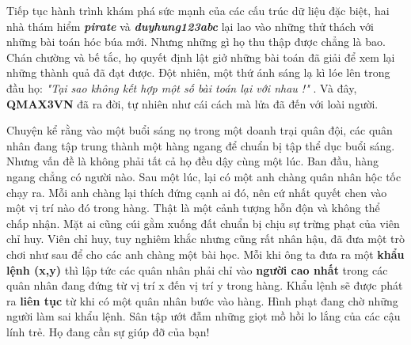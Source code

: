 Tiếp tục hành trình khám phá sức mạnh của các cấu trúc dữ liệu đặc biệt, hai nhà thám hiểm   \textbf{\emph{     pirate    }}   và   \textbf{\emph{     duyhung123abc    }}   lại lao vào những thử thách với những bài toán hóc búa mới. Nhưng những gì họ thu thập được chẳng là bao. Chán chường và bế tắc, họ quyết định lật giở những bài toán đã giải để xem lại những thành quả đã đạt được. Đột nhiên, một thứ ánh sáng lạ kì lóe lên trong đầu họ:   \emph{    "Tại sao không kết hợp một số bài toán lại với nhau !"   }   . Và đây,   \textbf{    QMAX3VN   }   đã ra đời, tự nhiên như cái cách mà lửa đã đến với loài người.  

   Chuyện kể rằng vào một buổi sáng nọ trong một doanh trại quân đội, các quân nhân đang tập trung thành một hàng ngang để chuẩn bị tập thể dục buổi sáng. Nhưng vấn đề là không phải tất cả họ đều dậy cùng một lúc. Ban đầu, hàng ngang chẳng có người nào. Sau một lúc, lại có một anh chàng quân nhân hộc tốc chạy ra. Mỗi anh chàng lại thích đứng cạnh ai đó, nên cứ nhất quyết chen vào một vị trí nào đó trong hàng. Thật là một cảnh tượng hỗn độn và không thể chấp nhận. Mặt ai cũng cúi gằm xuống đất chuẩn bị chịu sự trừng phạt của viên chỉ huy. Viên chỉ huy, tuy nghiêm khắc nhưng cũng rất nhân hậu, đã đưa một trò chơi như sau để cho các anh chàng một bài học. Mỗi khi ông ta đưa ra một   \textbf{    khẩu lệnh (x,y)   }   thì lập tức các quân nhân phải chỉ vào   \textbf{    người cao nhất   }   trong các quân nhân đang đứng từ vị trí x đến vị trí y trong hàng. Khẩu lệnh sẽ được phát ra   \textbf{    liên tục   }   từ khi có một quân nhân bước vào hàng. Hình phạt đang chờ những người làm sai khẩu lệnh. Sân tập ướt đẫm những giọt mồ hồi lo lắng của các cậu lính trẻ. Họ đang cần sự giúp đỡ của bạn!